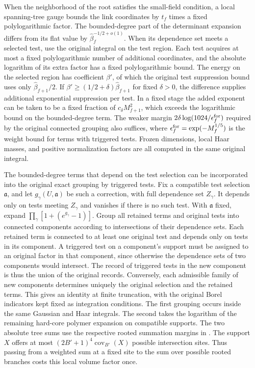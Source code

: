 \documentclass[11pt,a4paper]{article}
\numberwithin{equation}{section}
\begin{document}
When the neighborhood of the root satisfies the small-field condition, a local spanning-tree gauge bounds the link coordinates by \(t_f\) times a fixed polylogarithmic factor. The bounded-degree part of the determinant expansion differs from its flat value by \(\widehat\beta_f^{-1/2+o(1)}\). When its dependence set meets a selected test, use the original integral on the test region. Each test acquires at most a fixed polylogarithmic number of additional coordinates, and the absolute logarithm of its extra factor has a fixed polylogarithmic bound. The energy on the selected region has coefficient \(\beta'\), of which the original test suppression bound uses only \(\widehat\beta_{f+1}/2\). If \(\beta'\ge(1/2+\delta)\widehat\beta_{f+1}\) for fixed \(\delta>0\), the difference supplies additional exponential suppression per test. In a fixed stage the added exponent can be taken to be a fixed fraction of \(c_\delta M_{f+1}^{2}\), which exceeds the logarithmic bound on the bounded-degree term. The weaker margin \(2\delta\log(1024/\epsilon_f^{\rm for})\) required by the original connected grouping also suffices, where \(\epsilon_f^{\rm for}=\exp(-M_f^{1/5})\) is the weight bound for terms with triggered tests. Frozen dimensions, local Haar masses, and positive normalization factors are all computed in the same original integral.

The bounded-degree terms that depend on the test selection can be incorporated into the original exact grouping by triggered tests. Fix a compatible test selection \(\mathfrak a\), and let \(g_\gamma(U,\mathfrak a)\) be such a correction, with full dependence set \(Z_\gamma\). It depends only on tests meeting \(Z_\gamma\) and vanishes if there is no such test. With \(\mathfrak a\) fixed, expand \(\prod_\gamma[1+(e^{g_\gamma}-1)]\). Group all retained terms and original tests into connected components according to intersections of their dependence sets. Each retained term is connected to at least one original test and depends only on tests in its component. A triggered test on a component's support must be assigned to an original factor in that component, since otherwise the dependence sets of two components would intersect. The record of triggered tests in the new component is thus the union of the original records. Conversely, each admissible family of new components determines uniquely the original selection and the retained terms. This gives an identity at finite truncation, with the original Borel indicators kept fixed as integration conditions. The first grouping occurs inside the same Gaussian and Haar integrals. The second takes the logarithm of the remaining hard-core polymer expansion on compatible supports. The two absolute tree sums use the respective rooted summation margins in \cite[Lemmas 13.4--13.5 and 13.11]{armstrong}. The support \(X\) offers at most \((2B'+1)^4\operatorname{cov}_{B'}(X)\) possible intersection sites. Thus passing from a weighted sum at a fixed site to the sum over possible rooted branches costs this local volume factor once.
\end{document}
